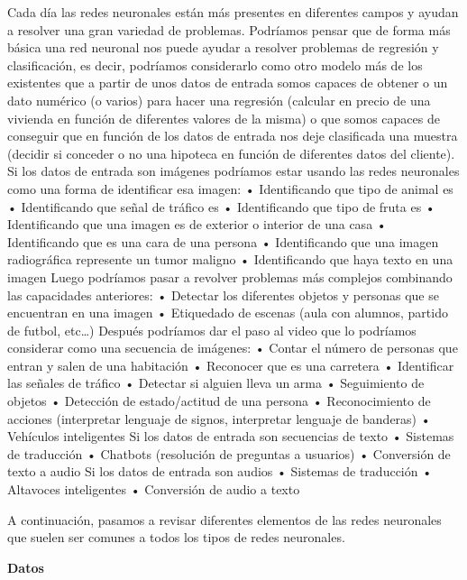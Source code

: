 \documentclass[
  a4paper,
  DIV=11,
  numbers=noendperiod]{scrreprt}
\begin{document}
Cada día las redes neuronales están más presentes en diferentes campos y
ayudan a resolver una gran variedad de problemas. Podríamos pensar que
de forma más básica una red neuronal nos puede ayudar a resolver
problemas de regresión y clasificación, es decir, podríamos considerarlo
como otro modelo más de los existentes que a partir de unos datos de
entrada somos capaces de obtener o un dato numérico (o varios) para
hacer una regresión (calcular en precio de una vivienda en función de
diferentes valores de la misma) o que somos capaces de conseguir que en
función de los datos de entrada nos deje clasificada una muestra
(decidir si conceder o no una hipoteca en función de diferentes datos
del cliente). Si los datos de entrada son imágenes podríamos estar
usando las redes neuronales como una forma de identificar esa imagen: •
Identificando que tipo de animal es • Identificando que señal de tráfico
es • Identificando que tipo de fruta es • Identificando que una imagen
es de exterior o interior de una casa • Identificando que es una cara de
una persona • Identificando que una imagen radiográfica represente un
tumor maligno • Identificando que haya texto en una imagen Luego
podríamos pasar a revolver problemas más complejos combinando las
capacidades anteriores: • Detectar los diferentes objetos y personas que
se encuentran en una imagen • Etiquedado de escenas (aula con alumnos,
partido de futbol, etc\ldots) Después podríamos dar el paso al video que
lo podríamos considerar como una secuencia de imágenes: • Contar el
número de personas que entran y salen de una habitación • Reconocer que
es una carretera • Identificar las señales de tráfico • Detectar si
alguien lleva un arma • Seguimiento de objetos • Detección de
estado/actitud de una persona • Reconocimiento de acciones (interpretar
lenguaje de signos, interpretar lenguaje de banderas) • Vehículos
inteligentes Si los datos de entrada son secuencias de texto • Sistemas
de traducción • Chatbots (resolución de preguntas a usuarios) •
Conversión de texto a audio Si los datos de entrada son audios •
Sistemas de traducción • Altavoces inteligentes • Conversión de audio a
texto

A continuación, pasamos a revisar diferentes elementos de las redes
neuronales que suelen ser comunes a todos los tipos de redes neuronales.

\textbf{Datos}
\end{document}
